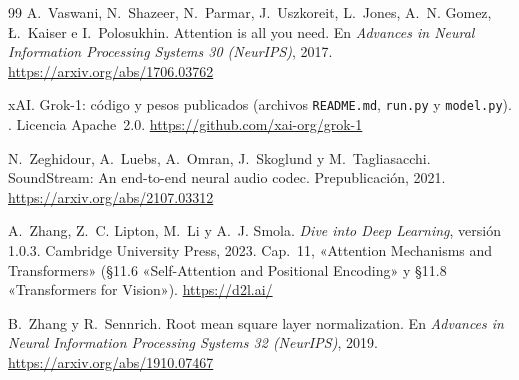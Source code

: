 \begin{thebibliography}{99}
A.~Vaswani, N.~Shazeer, N.~Parmar, J.~Uszkoreit, L.~Jones, A.~N. Gomez, Ł.~Kaiser e I.~Polosukhin.
\newblock Attention is all you need.
\newblock En \emph{Advances in Neural Information Processing Systems 30 (NeurIPS)}, 2017.
\newblock \url{https://arxiv.org/abs/1706.03762}

xAI.
\newblock Grok-1: código y pesos publicados (archivos \texttt{README.md}, \texttt{run.py} y \texttt{model.py}).
. Licencia Apache~2.0.
\newblock \url{https://github.com/xai-org/grok-1}

N.~Zeghidour, A.~Luebs, A.~Omran, J.~Skoglund y M.~Tagliasacchi.
\newblock SoundStream: An end-to-end neural audio codec.
\newblock Prepublicación, 2021.
\newblock \url{https://arxiv.org/abs/2107.03312}

A.~Zhang, Z.~C. Lipton, M.~Li y A.~J. Smola.
\newblock \emph{Dive into Deep Learning}, versión 1.0.3.
\newblock Cambridge University Press, 2023.
\newblock Cap.~11, «Attention Mechanisms and Transformers» (§11.6 «Self-Attention and Positional Encoding» y §11.8 «Transformers for Vision»).
\newblock \url{https://d2l.ai/}

B.~Zhang y R.~Sennrich.
\newblock Root mean square layer normalization.
\newblock En \emph{Advances in Neural Information Processing Systems 32 (NeurIPS)}, 2019.
\newblock \url{https://arxiv.org/abs/1910.07467}

\end{thebibliography}
